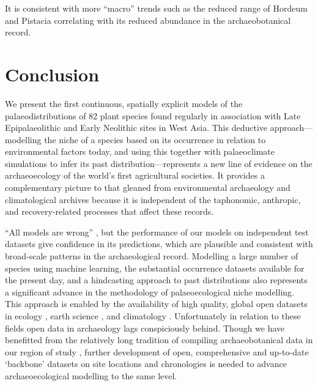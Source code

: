 \documentclass[
  authoryear,
  preprint]{elsarticle}
\begin{document}
It is consistent with more ``macro'' trends such as the reduced range of
Hordeum and Pistacia correlating with its reduced abundance in the
archaeobotanical record.

\section{Conclusion}\label{conclusion}

We present the first continuous, spatially explicit models of the
palaeodistributions of 82 plant species found regularly in association
with Late Epipalaeolithic and Early Neolithic sites in West Asia. This
deductive approach---modelling the niche of a species based on its
occurrence in relation to environmental factors today, and using this
together with palaeoclimate simulations to infer its past
distribution---represents a new line of evidence on the archaeoecology
of the world's first agricultural societies. It provides a complementary
picture to that gleaned from environmental archaeology and
climatological archives because it is independent of the taphonomic,
anthropic, and recovery-related processes that affect these records.

``All models are wrong'' \citep{Box1976}, but the performance of our
models on independent test datasets give confidence in its predictions,
which are plausible and consistent with broad-scale patterns in the
archaeological record. Modelling a large number of species using machine
learning, the substantial occurrence datasets available for the present
day, and a hindcasting approach to past distributions also represents a
significant advance in the methodology of palaeoecological niche
modelling. This approach is enabled by the availability of high quality,
global open datasets in ecology \citep{GBIF2025, GBIFSecretariat2023},
earth science \citep{SRTM}, and climatology
\citep{KargerEtAl2017, BrownEtAl2018}. Unfortunately in relation to
these fields open data in archaeology lags conspiciously behind. Though
we have benefitted from the relatively long tradition of compiling
archaeobotanical data in our region of study
\citep{ColledgeEtAl2004, ShennanConolly2007, ADEMNES, LucasFuller2018, FullerEtAl2018, WallaceEtAl2018, ORIGINS},
further development of open, comprehensive and up-to-date `backbone'
datasets on site locations and chronologies is needed to advance
archaeoecological modelling to the same level.


\renewcommand\refname{References}
  
\end{document}
